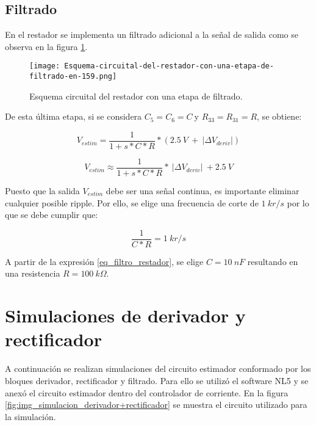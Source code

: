 \subsection{Filtrado}

En el restador se implementa un filtrado adicional a la señal de salida como se observa en la figura  \ref{fig:img_Esquema-circuital-del-restador-con-una-etapa-de-filtrado-en-159}. 

\begin{figure}[H]
	\centering
	\texttt{[image: Esquema-circuital-del-restador-con-una-etapa-de-filtrado-en-159.png]}
	\caption{Esquema circuital del restador con una etapa de filtrado.}
	\label{fig:img_Esquema-circuital-del-restador-con-una-etapa-de-filtrado-en-159}
\end{figure}

De esta última etapa, si se considera $C_5=C_6=C\ $y $R_{33}=R_{31}=R$, se obtiene:


\begin{equation} \label{eq_Vestim_1}
	V_{estim}=\frac{1}{1+s*C*R}*(2.5\: V\ +\ |\mathit{\Delta}V_{deriv}|)
\end{equation}

\begin{equation} \label{eq_Vestim_2}
	V_{estim} \approx \frac{1}{1+s*C*R}*\ |\mathit{\Delta}V_{deriv}|\ +2.5\:V
\end{equation}

Puesto que la salida $V_{estim}$ debe ser una señal continua, es importante eliminar cualquier posible ripple. Por ello, se elige una frecuencia de corte de $1\:kr/s$ por lo que se debe cumplir que:

\begin{equation}\label{eq_filtro_restador}
	 \frac{1}{C*R}=1\:kr/s
\end{equation}

A partir de la expresión \ref{eq_filtro_restador}, se elige $C=10\: nF$ resultando en una resistencia $R=100\:k\Omega$.

\section{Simulaciones de derivador y rectificador}

A continuación se realizan simulaciones del circuito estimador conformado por los bloques derivador, rectificador y filtrado. Para ello se utilizó el software NL5 y se anexó el circuito estimador dentro del controlador de corriente. En la figura \ref{fig:img_simulacion_derivador+rectificador} se muestra el circuito utilizado para la simulación.

